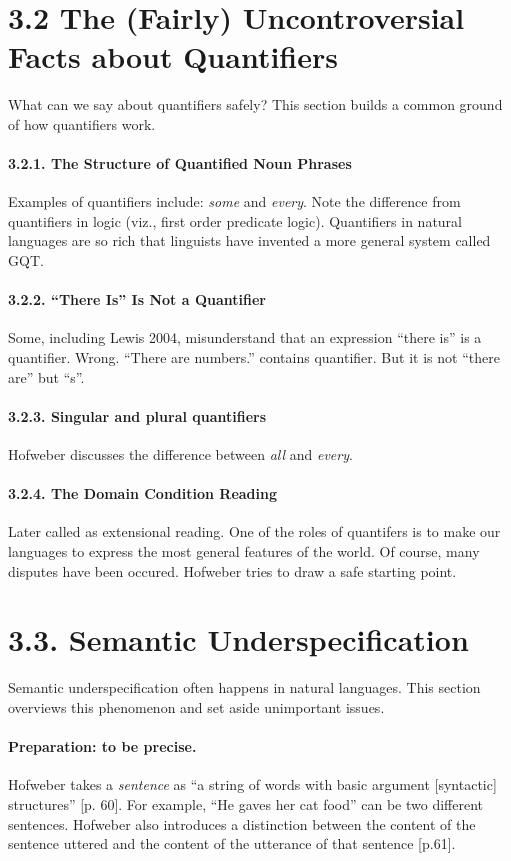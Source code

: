 \documentclass[
10pt, %
a4paper, %
twocolumn, %
landscape %
]{article}
\begin{document}
\section*{3.2 The (Fairly) Uncontroversial Facts about Quantifiers}
What can we say about quantifiers safely?
This section builds a common ground of how quantifiers work.

\paragraph{3.2.1. The Structure of Quantified Noun Phrases}
Examples of quantifiers include: \emph{some} and \emph{every}.
Note the difference from quantifiers in logic (viz., first order predicate logic). Quantifiers in natural languages are so rich that linguists have invented a more general system called GQT.

\paragraph{3.2.2. ``There Is'' Is Not a Quantifier}
Some, including Lewis 2004, misunderstand that an expression ``there is'' is
a quantifier.
Wrong. ``There are numbers.'' contains quantifier.
But it is not ``there are'' but ``s''.

\paragraph{3.2.3. Singular and plural quantifiers}
Hofweber discusses the difference between \emph{all} and \emph{every}.

\paragraph{3.2.4. The Domain Condition Reading}
Later called as extensional reading.
One of the roles of quantifers is to make our languages to express the most general
features of the world.
Of course, many disputes have been occured. Hofweber tries to draw a safe starting point.

\section*{3.3. Semantic Underspecification}
Semantic underspecification often happens in natural languages.
This section overviews this phenomenon and set aside unimportant issues.

\paragraph{Preparation: to be precise.}
 Hofweber takes a \emph{sentence} as ``a string of words with basic argument [syntactic] structures'' [p. 60]. For example, ``He gaves her cat food'' can be two different sentences. Hofweber also introduces a distinction between the content of the sentence uttered and the content of the utterance of that sentence [p.61].
\end{document}
